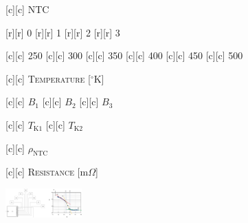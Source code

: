 [c][c] {\scriptsize \textsc{NTC}}

[r][r] {\scriptsize 0}
[r][r] {\scriptsize 1}
[r][r] {\scriptsize 2}
[r][r] {\scriptsize 3}

[c][c] {\scriptsize 250}
[c][c] {\scriptsize 300}
[c][c] {\scriptsize 350}
[c][c] {\scriptsize 400}
[c][c] {\scriptsize 450}
[c][c] {\scriptsize 500}

[c][c] {\scriptsize \textsc{Temperature} [$^{\circ}$K]}

[c][c] {\scriptsize $B_{1}$}
[c][c] {\scriptsize $B_{2}$}
[c][c] {\scriptsize $B_{3}$}

[c][c] {\scriptsize $T_{\text{K1}}$}
[c][c] {\scriptsize $T_{\text{K2}}$}

[c][c] {\scriptsize $\rho_{\text{NTC}}$}

[c][c] {\scriptsize \textsc{Resistance} [m$\Omega$]}

\includegraphics[width=0.22\textwidth]{semiconductorBA.eps}